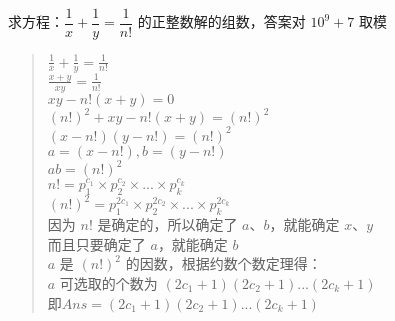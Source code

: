\documentclass[E:/GsjzTle/main/main.tex]{subfiles}
\begin{document}
求方程：\(\dfrac{1}{x} + \dfrac{1}{y} = \dfrac{1}{n!}\)
的正整数解的组数，答案对 \(10^9+7\) 取模

\begin{quote}
\(\frac{1}{x}+\frac{1}{y}=\frac{1}{n!}\)\\
\(\frac{x+y}{xy}=\frac{1}{n!}\)\\
\(xy-n!(x+y)=0\)\\
\((n!)^2+xy-n!(x+y)=(n!)^2\)\\
\((x-n!)(y-n!)=(n!)^2\)\\
\(a=(x-n!),b=(y-n!)\)\\
\(ab=(n!)^2\)\\
\(n!=p_1^{c_1}\times p_2^{c_2}\times ...\times p_k^{c_k}\)\\
\((n!)^2=p_1^{2c_1}\times p_2^{2c_2}\times ...\times p_k^{2c_k}\)\\
因为 \(n!\) 是确定的，所以确定了 \(a、b\)，就能确定 \(x、y\)\\
而且只要确定了 \(a\)，就能确定 \(b\)\\
\(a\) 是 \((n!)^2\) 的因数，根据约数个数定理得：\\
\(a\) 可选取的个数为 \((2c_1+1)(2c_2+1)...(2c_k+1)\)\\
即\(Ans=(2c_1+1)(2c_2+1)...(2c_k+1)\)
\end{quote}
\end{document}
